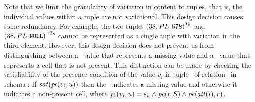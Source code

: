Note that we limit the granularity of variation in content to tuples, that is,
the individual values within a tuple are not variational.
%
This design decision causes some redundancy.
For example, the two tuples
\ensuremath{\annot [\tFive] {(38, PL, 678)}} and 
\ensuremath{\annot [\neg \tFive] {(38, PL, \nul)}}
cannot be represented as a single tuple
with variation in the third element. However, this design decision
does not prevent us from distinguishing between a \nul\ value
that represents a missing value and a \nul\ value that represents
a cell that is not present. This distinction can be made by checking
the satisfiability of 
the presence condition of the value $v_i$ in tuple \vTuple\ of relation \vRel\ in schema \vSch:
If $\sat{\getPCfrom {v_i} \vTuple}$ then the \nul\ indicates a missing value
and otherwise it indicates a non-present cell, where 
\ensuremath{\getPCfrom {v_i} \vTuple = \dimMeta_\vTuple \wedge \getPCfrom \vRel \vSch
\wedge \getPCfrom {\getAtt i} \vRel}.
%

%
